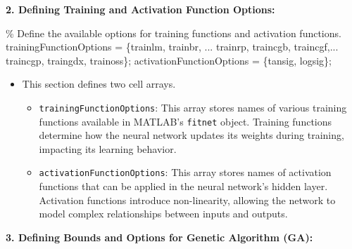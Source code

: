 \documentclass[
]{agujournal2019}
\newenvironment{Shaded}{\begin{snugshade}}{\end{snugshade}}
\newcommand{\CommentTok}[1]{\textcolor[rgb]{0.37,0.37,0.37}{#1}}
\newcommand{\NormalTok}[1]{\textcolor[rgb]{0.00,0.23,0.31}{#1}}
\newcommand{\OperatorTok}[1]{\textcolor[rgb]{0.37,0.37,0.37}{#1}}
\newcommand{\SpecialStringTok}[1]{\textcolor[rgb]{0.13,0.47,0.30}{#1}}
\newcommand{\VariableTok}[1]{\textcolor[rgb]{0.07,0.07,0.07}{#1}}
\providecommand{\tightlist}{%
  \setlength{\itemsep}{0pt}\setlength{\parskip}{0pt}}\usepackage{longtable,booktabs,array}
\begin{document}
\textbf{2. Defining Training and Activation Function Options:}

\begin{Shaded}
\begin{Highlighting}[]
\CommentTok{\% Define the available options for training functions and activation functions.}
    \VariableTok{trainingFunctionOptions} \OperatorTok{=}\NormalTok{ \{}\SpecialStringTok{\textquotesingle{}trainlm\textquotesingle{}}\OperatorTok{,} \SpecialStringTok{\textquotesingle{}trainbr\textquotesingle{}}\OperatorTok{,} \OperatorTok{...}
    \SpecialStringTok{\textquotesingle{}trainrp\textquotesingle{}}\OperatorTok{,} \SpecialStringTok{\textquotesingle{}traincgb\textquotesingle{}}\OperatorTok{,} \SpecialStringTok{\textquotesingle{}traincgf\textquotesingle{}}\OperatorTok{,...}
     \SpecialStringTok{\textquotesingle{}traincgp\textquotesingle{}}\OperatorTok{,} \SpecialStringTok{\textquotesingle{}traingdx\textquotesingle{}}\OperatorTok{,} \SpecialStringTok{\textquotesingle{}trainoss\textquotesingle{}}\NormalTok{\}}\OperatorTok{;}
    \VariableTok{activationFunctionOptions} \OperatorTok{=}\NormalTok{ \{}\SpecialStringTok{\textquotesingle{}tansig\textquotesingle{}}\OperatorTok{,} \SpecialStringTok{\textquotesingle{}logsig\textquotesingle{}}\NormalTok{\}}\OperatorTok{;}
\end{Highlighting}
\end{Shaded}

\begin{itemize}
\tightlist
\item
  This section defines two cell arrays.

  \begin{itemize}
  \tightlist
  \item
    \texttt{trainingFunctionOptions}: This array stores names of various
    training functions available in MATLAB's \texttt{fitnet} object.
    Training functions determine how the neural network updates its
    weights during training, impacting its learning behavior.
  \item
    \texttt{activationFunctionOptions}: This array stores names of
    activation functions that can be applied in the neural network's
    hidden layer. Activation functions introduce non-linearity, allowing
    the network to model complex relationships between inputs and
    outputs.
  \end{itemize}
\end{itemize}

\textbf{3. Defining Bounds and Options for Genetic Algorithm (GA):}
\end{document}
